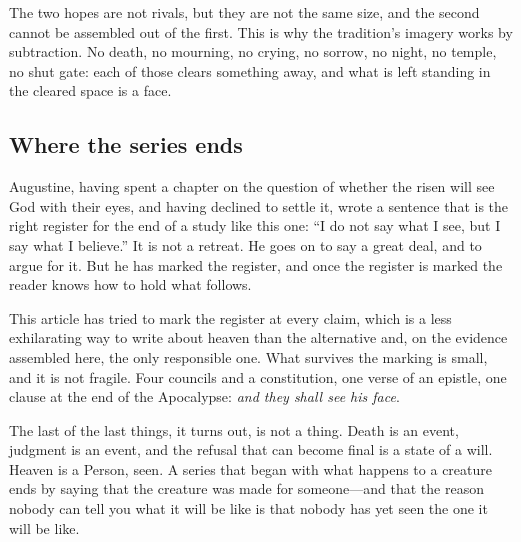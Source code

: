 The two hopes are not rivals, but they are not the same size, and the second cannot be assembled out of the first. This is why the tradition's imagery works by subtraction. No death, no mourning, no crying, no sorrow, no night, no temple, no shut gate: each of those clears something away, and what is left standing in the cleared space is a face.

\subsection{Where the series ends}

Augustine, having spent a chapter on the question of whether the risen will see God with their eyes, and having declined to settle it, wrote a sentence that is the right register for the end of a study like this one: ``I do not say what I see, but I say what I believe.'' It is not a retreat. He goes on to say a great deal, and to argue for it. But he has marked the register, and once the register is marked the reader knows how to hold what follows.

This article has tried to mark the register at every claim, which is a less exhilarating way to write about heaven than the alternative and, on the evidence assembled here, the only responsible one. What survives the marking is small, and it is not fragile. Four councils and a constitution, one verse of an epistle, one clause at the end of the Apocalypse: \emph{and they shall see his face}.

The last of the last things, it turns out, is not a thing. Death is an event, judgment is an event, and the refusal that can become final is a state of a will. Heaven is a Person, seen. A series that began with what happens to a creature ends by saying that the creature was made for someone---and that the reason nobody can tell you what it will be like is that nobody has yet seen the one it will be like.

